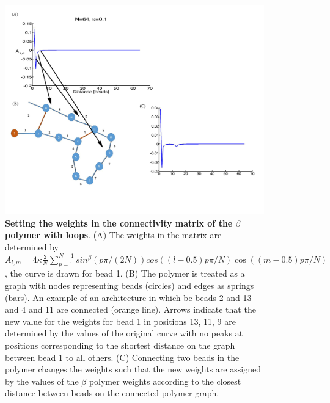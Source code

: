 \documentclass[12pt]{article}
\begin{document}
\begin{figure}[H]
\includegraphics[scale=0.5]{Figure05_betaModelWeights}
\caption{\textbf{Setting the weights in the connectivity matrix of the $\beta$ polymer with loops}. (A) The weights in the matrix are determined by $A_{l,m}= 4\kappa \frac{2}{N}\sum_{p=1}^{N-1} sin^{\beta}(p\pi/(2N))cos((l-0.5)p\pi/N)\cos((m-0.5)p\pi/N)$, the curve is drawn for bead 1. (B) The polymer is treated as a graph with nodes representing beads (circles) and edges as springs (bars). An example of an architecture in which be beads 2 and 13 and 4 and 11 are connected (orange line). Arrows indicate that the new value for the weights for bead 1 in positions 13, 11, 9 are determined by the values of the original curve with no peaks at positions corresponding to the shortest distance on the graph between bead 1 to all others. (C) Connecting two beads in the polymer changes the weights  such that the new weights are assigned by the values of the $\beta$ polymer weights according to the closest distance between beads on the connected polymer graph.}
\label{settingBetsModelWeights}
\end{figure}
\end{document}

